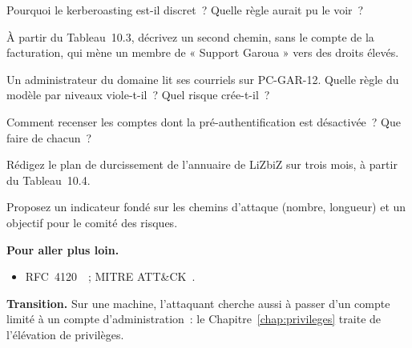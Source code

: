 \begin{boxexo}[title={\ding{45}\quad Exercice~10.5. Pourquoi le SOC n'a rien vu \niveaumoyen}]
Pourquoi le kerberoasting est-il discret~? Quelle règle aurait pu le voir~?
\end{boxexo}

\begin{boxexo}[title={\ding{45}\quad Exercice~10.6. Le chemin \niveaumoyen}]
À partir du Tableau~10.3, décrivez un second chemin, sans le compte de la
facturation, qui mène un membre de « Support Garoua » vers des droits
élevés.
\end{boxexo}

\begin{boxexo}[title={\ding{45}\quad Exercice~10.7. Niveaux \niveaumoyen}]
Un administrateur du domaine lit ses courriels sur PC-GAR-12. Quelle règle
du modèle par niveaux viole-t-il~? Quel risque crée-t-il~?
\end{boxexo}

\begin{boxexo}[title={\ding{45}\quad Exercice~10.8. AS-REP \niveaumoyen}]
Comment recenser les comptes dont la pré-authentification est désactivée~?
Que faire de chacun~?
\end{boxexo}

\begin{boxexo}[title={\ding{45}\quad Exercice~10.9. Le plan \niveauexpert}]
Rédigez le plan de durcissement de l'annuaire de LiZbiZ sur trois mois, à
partir du Tableau~10.4.
\end{boxexo}

\begin{boxexo}[title={\ding{45}\quad Exercice~10.10. Mesurer les chemins \niveauexpert}]
Proposez un indicateur fondé sur les chemins d'attaque (nombre, longueur)
et un objectif pour le comité des risques.
\end{boxexo}

\bigskip

\begin{boxinfo}
\textbf{Pour aller plus loin.}
\begin{itemize}
    \item RFC~4120~\cite{rfc4120}~; MITRE ATT\&CK~\cite{mitreattack}.
\end{itemize}
\end{boxinfo}

\begin{boxinfo}
\textbf{Transition.} Sur une machine, l'attaquant cherche aussi à passer
d'un compte limité à un compte d'administration~: le
Chapitre~\ref{chap:privileges} traite de l'élévation de privilèges.
\end{boxinfo}
